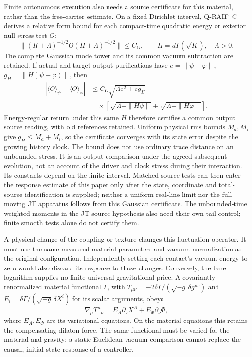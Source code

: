 Finite autonomous execution also needs a source certificate for this
material, rather than the free-carrier estimate. On a fixed Dirichlet
interval, Q-RAIF~C derives a relative form bound for each compact-time
quadratic energy or exterior null-stress test $O$:
\[
 \|(H+\Lambda)^{-1/2}O(H+\Lambda)^{-1/2}\|\le C_O,
 \qquad H=d\Gamma(\sqrt K),\quad\Lambda>0.
\]
The complete Gaussian mode tower and its common vacuum subtraction
are retained. If actual and target output purifications have
$e=\|\psi-\varphi\|$, $g_H=\|H(\psi-\varphi)\|$, then
\begin{align}
 |\langle O\rangle_\psi-\langle O\rangle_\varphi|
 &\le C_O\sqrt{\Lambda e^2+eg_H}\nonumber\\
 &\quad\times\left[\sqrt{\Lambda+\|H\psi\|}
                    +\sqrt{\Lambda+\|H\varphi\|}\right].
 \label{eq:Gaussian-material-source-error}
\end{align}
Energy-regular return under this same $H$ therefore certifies a common
output source reading, with old references retained. Uniform physical
rms bounds $M_a,M_i$ give $g_H\le M_a+M_i$, so the certificate
converges with its state error despite the growing history clock.
The bound does
not use ordinary trace distance on an unbounded stress. It is an
output comparison under the agreed subsequent evolution, not an
account of the driver and clock stress during their interaction.
Its constants depend on the finite interval. Matched source tests
can then enter the response estimate of this paper only after the
state, coordinate and total-source identification is supplied;
neither a uniform real-line limit nor the full moving JT apparatus
follows from this Gaussian certificate.
The unbounded-time weighted moments in the JT source hypothesis
also need their own tail control; finite smooth tests alone do not
certify them.

A physical change of the coupling or texture changes this fluctuation
operator. It must use the same measured material parameters and vacuum
normalization as the original configuration. Independently setting each
contact's vacuum energy to zero would also discard its response to those
changes. Conversely, the bare logarithm supplies no finite universal
gravitational price. A covariantly renormalized material functional
$\Gamma$, with $T_{\mu\nu}=-2\delta\Gamma/(\sqrt{-g}\,\delta g^{\mu\nu})$
and $E_i=\delta\Gamma/(\sqrt{-g}\,\delta X^i)$ for its scalar arguments, obeys
\[
 \nabla_\mu T^\mu{}_{\nu}=E_A\partial_\nu X^A+E_\Phi\partial_\nu\Phi,
\]
where $E_A,E_\Phi$ are its variational equations. On the material equations
this retains the compensating dilaton force. The same functional must
be varied for the material and gravity; a static Euclidean vacuum
comparison cannot replace the causal, initial-state response of a controller.


